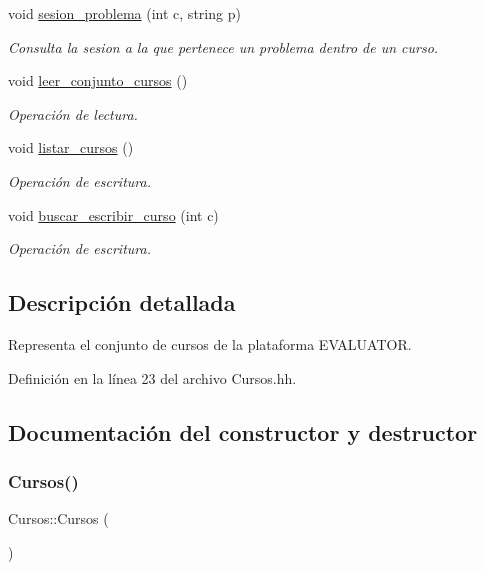 \begin{DoxyCompactItemize}
void \mbox{\hyperlink{class_cursos_aa5a8cdb45236245e938ba34481a788fe}{sesion\+\_\+problema}} (int c, string p)
\begin{DoxyCompactList}\small\item\em Consulta la sesion a la que pertenece un problema dentro de un curso. \end{DoxyCompactList}\item 
void \mbox{\hyperlink{class_cursos_a6eeda75d794cfd75a0137977d15d0cc6}{leer\+\_\+conjunto\+\_\+cursos}} ()
\begin{DoxyCompactList}\small\item\em Operación de lectura. \end{DoxyCompactList}\item 
void \mbox{\hyperlink{class_cursos_aeb29e1a1c81d4bbe0537653a0a6bbc08}{listar\+\_\+cursos}} ()
\begin{DoxyCompactList}\small\item\em Operación de escritura. \end{DoxyCompactList}\item 
void \mbox{\hyperlink{class_cursos_af870c77c0a43615e18d4f7c5db30c49f}{buscar\+\_\+escribir\+\_\+curso}} (int c)
\begin{DoxyCompactList}\small\item\em Operación de escritura. \end{DoxyCompactList}\end{DoxyCompactItemize}


\subsection{Descripción detallada}
Representa el conjunto de cursos de la plataforma E\+V\+A\+L\+U\+A\+T\+OR. 

Definición en la línea 23 del archivo Cursos.\+hh.



\subsection{Documentación del constructor y destructor}
\mbox{\label{class_cursos_acdb8d248e1a8ebe1aac747efa7b54cd4}} 
\subsubsection{\texorpdfstring{Cursos()}{Cursos()}}
{\footnotesize\ttfamily Cursos\+::\+Cursos (\begin{DoxyParamCaption}{ }\end{DoxyParamCaption})}



